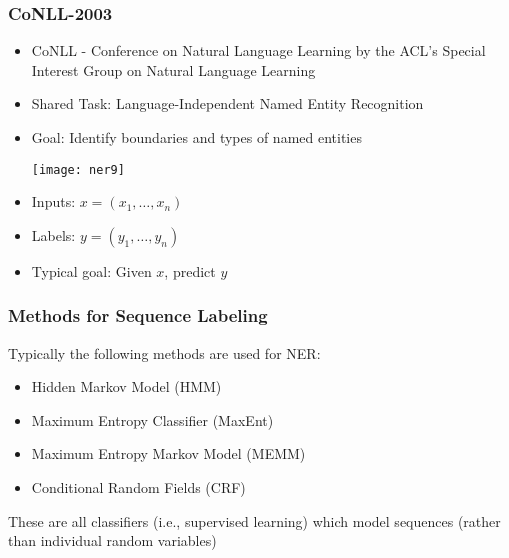 \begin{frame}[fragile]\frametitle{CoNLL-2003}
  \begin{itemize}
  \item CoNLL - Conference on Natural Language Learning by the ACL's Special Interest Group on Natural Language Learning
  \item Shared Task: Language-Independent Named Entity Recognition
  \item Goal: Identify boundaries and types of named entities
\begin{center}
\texttt{[image: ner9]}
\end{center}
\item Inputs: $x = (x_1,\ldots, x_n)$
\item Labels: $y = (y_1,\ldots, y_n)$
\item Typical goal: Given $x$, predict $y$

  \end{itemize}
\end{frame}

\begin{frame}[fragile]\frametitle{Methods for Sequence Labeling}
Typically the following methods are used for NER:
  \begin{itemize}
  \item Hidden Markov Model (HMM)
  \item Maximum Entropy Classifier (MaxEnt)
  \item Maximum Entropy Markov Model (MEMM)
  \item Conditional Random Fields (CRF)
  \end{itemize}
These are all classifiers (i.e., supervised learning) which model sequences (rather than individual random variables)
\end{frame}


